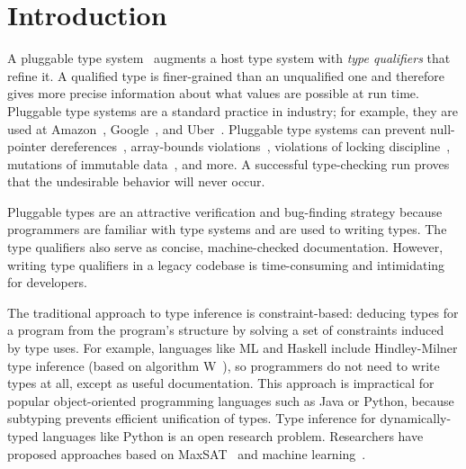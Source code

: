 \section{Introduction}
\label{sec:intro}



A pluggable type system~\cite{FosterFFA99} augments a host type system
with \emph{type qualifiers} that refine it.  A qualified type is
finer-grained than an unqualified one and therefore gives more precise
information about what values are possible at run time.
Pluggable type systems are a standard practice in industry; for example,
they are used at Amazon~\cite{KelloggSTE2020,KelloggRSSE2020},
Google~\cite{SadowskiAEMCJ2018}, and Uber~\cite{BanerjeeCS2019}.
Pluggable type systems
can prevent  null-pointer
dereferences~\cite{BanerjeeCS2019,PapiACPE2008,DietlDEMS2011},
array-bounds violations~\cite{KelloggDME2018},
violations of locking discipline~\cite{ErnstLMST2016},
mutations of immutable data~\cite{DietlDEMS2011,PapiACPE2008,coblenz2017glacier},
and more.
A successful type-checking run proves that the undesirable behavior will
never occur.

Pluggable types are an attractive verification and bug-finding strategy
because programmers
are familiar with type systems and are used to writing types.
The type qualifiers also serve as concise, machine-checked documentation.
However, writing type qualifiers in a legacy codebase
is time-consuming and intimidating for developers.

The traditional approach to type inference is constraint-based:
deducing types for a program from the program's structure
by solving a set of constraints induced by type uses.
%
For example, languages like ML and Haskell
include Hindley-Milner type inference (based on algorithm
W~\cite{DamasM1982}), so programmers do not need to write types at all,
except as useful documentation.
%
This approach is impractical for popular object-oriented programming
languages such as Java or Python, because subtyping prevents efficient
unification of types.
%
Type inference for dynamically-typed languages like Python is an open
research problem. Researchers have proposed approaches based
on MaxSAT~\cite{hassan2018maxsmt} and machine learning~\cite{xu2016python,peng2022static}.

